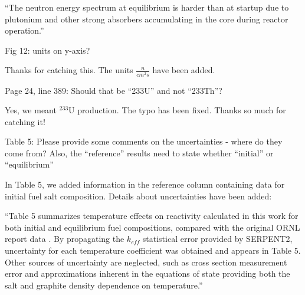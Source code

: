 \documentclass[answers,11pt]{exam}
\begin{document}
\begin{questions}
\begin{solution}
                         ``The neutron energy spectrum at equilibrium is harder 
                         than at startup due to plutonium and other strong 
                         absorbers accumulating in the core during reactor 
                         operation.''
        \end{solution}

        \question  Fig 12: units on y-axis?
        \begin{solution}
                Thanks for catching this. The units $\frac{n}{cm^2 s}$ have been added.
        \end{solution}

        \question  Page 24, line 389: Should that be ``233U'' and not ``233Th''?
        \begin{solution}
                Yes, we meant $^{233}$U production. The typo has been fixed. 
                Thanks so much for catching it!
        \end{solution}

        \question  Table 5: Please provide some comments on the uncertainties - 
        where do they come from? Also, the ``reference'' results need to state 
        whether ``initial'' or ``equilibrium''
        \begin{solution}
                In Table 5, we added information in the reference column 
                containing data for initial fuel salt composition. Details 
                about uncertainties have been added:

                ``Table 5 summarizes temperature effects on reactivity calculated 
                in this work for both initial and equilibrium fuel 
                compositions, compared with the original \gls{ORNL} report data 
                \cite{robertson_conceptual_1971}.  By propagating the $k_{eff}$  
                statistical error provided by SERPENT2, uncertainty for each 
                temperature coefficient was obtained and appears in Table 5. 
                Other sources of uncertainty are neglected, such as cross 
                section measurement error and approximations inherent in the 
                equations of state providing both the salt and graphite density 
                dependence on temperature.''

        \end{solution}


\end{questions}
\end{document}

